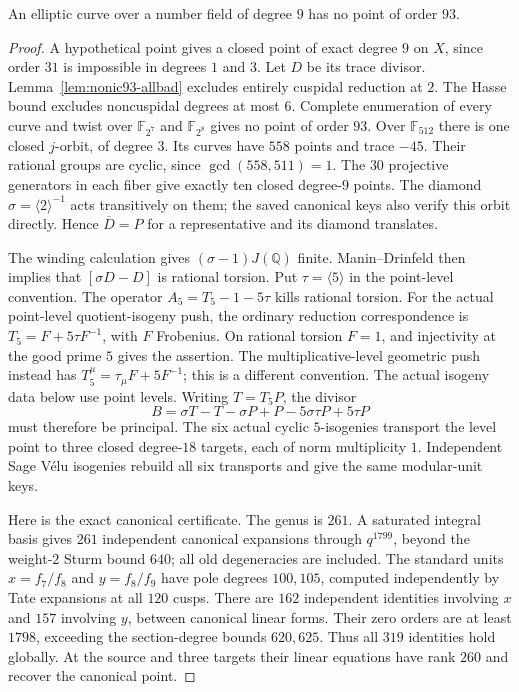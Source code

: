\begin{proposition}\label{prop:nonic93-exclusion}
An elliptic curve over a number field of degree $9$ has no point of
order $93$.
\end{proposition}
\begin{proof}
A hypothetical point gives a closed point of exact degree $9$ on $X$,
since order $31$ is impossible in degrees $1$ and $3$.
Let $D$ be its trace divisor. Lemma~\ref{lem:nonic93-allbad} excludes
entirely cuspidal reduction at $2$.
The Hasse bound excludes noncuspidal degrees at most $6$.
Complete enumeration of every curve and twist over
$\mathbb F_{2^7}$ and $\mathbb F_{2^8}$ gives no point of order $93$.
Over $\mathbb F_{512}$ there is one closed $j$-orbit, of degree $3$.
Its curves have $558$ points and trace $-45$. Their rational groups
are cyclic, since $\gcd(558,511)=1$. The $30$ projective generators
in each fiber give exactly ten closed degree-$9$ points.
The diamond $\sigma=\langle2\rangle^{-1}$ acts transitively on them;
the saved canonical keys also verify this orbit directly.
Hence $\overline D=P$ for a representative and its diamond translates.

The winding calculation gives $(\sigma-1)J(\mathbb Q)$ finite.
Manin--Drinfeld then implies that $[\sigma D-D]$ is rational torsion.
Put $\tau=\langle5\rangle$ in the point-level convention.
The operator $A_5=T_5-1-5\tau$ kills rational torsion.
For the actual point-level quotient-isogeny push, the ordinary
reduction correspondence is $T_5=F+5\tau F^{-1}$, with $F$
Frobenius. On rational torsion $F=1$, and injectivity at the good
prime $5$ gives the assertion. The multiplicative-level geometric
push instead has $T_5^{\mu}=\tau_{\mu}F+5F^{-1}$; this is a
different convention. The actual isogeny data below use point levels.
Writing $T=T_5P$, the divisor
\[
 B=\sigma T-T-\sigma P+P-5\sigma\tau P+5\tau P
\]
must therefore be principal. The six actual cyclic $5$-isogenies
transport the level point to three closed degree-$18$ targets, each
of norm multiplicity $1$. Independent Sage V\'elu isogenies rebuild
all six transports and give the same modular-unit keys.

Here is the exact canonical certificate. The genus is $261$.
A saturated integral basis gives $261$ independent canonical
expansions through $q^{1799}$, beyond the weight-$2$ Sturm bound $640$;
all old degeneracies are included. The standard units $x=f_7/f_8$ and
$y=f_8/f_9$ have pole degrees $100,105$, computed independently by
Tate expansions at all $120$ cusps. There are $162$ independent
identities involving $x$ and $157$ involving $y$, between canonical
linear forms. Their zero orders are at least $1798$, exceeding the
section-degree bounds $620,625$. Thus all $319$ identities hold globally.
At the source and three targets their linear equations have rank $260$
and recover the canonical point.


\end{proof}
